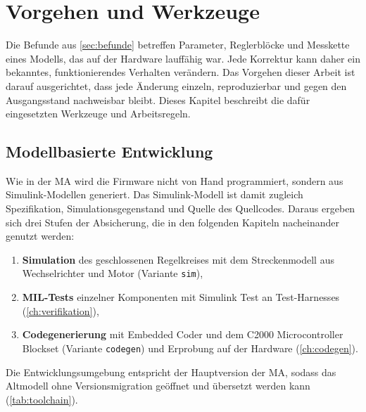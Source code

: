 \chapter{Vorgehen und Werkzeuge}
\label{ch:vorgehen}

Die Befunde aus \cref{sec:befunde} betreffen Parameter, Reglerblöcke und Messkette eines
Modells, das auf der Hardware lauffähig war. Jede Korrektur kann daher ein bekanntes,
funktionierendes Verhalten verändern. Das Vorgehen dieser Arbeit ist darauf ausgerichtet,
dass jede Änderung einzeln, reproduzierbar und gegen den Ausgangsstand nachweisbar bleibt.
Dieses Kapitel beschreibt die dafür eingesetzten Werkzeuge und Arbeitsregeln.

\section{Modellbasierte Entwicklung}
\label{sec:mbd}

Wie in der \ac{MA} \cite{akguel2023} wird die Firmware nicht von Hand programmiert, sondern
aus Simulink-Modellen generiert. Das Simulink-Modell ist damit zugleich Spezifikation,
Simulationsgegenstand und Quelle des Quellcodes. Daraus ergeben sich drei Stufen der
Absicherung, die in den folgenden Kapiteln nacheinander genutzt werden:

\begin{enumerate}
  \item \textbf{Simulation} des geschlossenen Regelkreises mit dem Streckenmodell aus
    Wechselrichter und Motor (Variante \texttt{sim}),
  \item \textbf{\ac{MIL}-Tests} einzelner Komponenten mit Simulink Test an
    Test-Harnesses (\cref{ch:verifikation}),
  \item \textbf{Codegenerierung} mit Embedded Coder \cite{mw_ecoder} und dem C2000
    Microcontroller Blockset \cite{mw_c2000} (Variante \texttt{codegen}) und Erprobung auf
    der Hardware (\cref{ch:codegen}).
\end{enumerate}

Die Entwicklungsumgebung entspricht der Hauptversion der \ac{MA}, sodass das Altmodell ohne
Versionsmigration geöffnet und übersetzt werden kann (\cref{tab:toolchain}).

